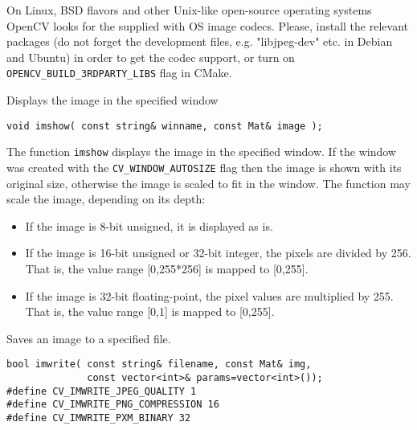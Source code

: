 On Linux, BSD flavors and other Unix-like open-source operating systems OpenCV looks for the supplied with OS image codecs. Please, install the relevant packages (do not forget the development files, e.g. "libjpeg-dev" etc. in Debian and Ubuntu) in order to get the codec support, or turn on \texttt{OPENCV\_BUILD\_3RDPARTY\_LIBS} flag in CMake. 

\label{imshow}
Displays the image in the specified window

\begin{lstlisting}
void imshow( const string& winname, const Mat& image );
\end{lstlisting}
\begin{description}
\end{description}

The function \texttt{imshow} displays the image in the specified window. If the window was created with the \texttt{CV\_WINDOW\_AUTOSIZE} flag then the image is shown with its original size, otherwise the image is scaled to fit in the window. The function may scale the image, depending on its depth:
\begin{itemize}
    \item If the image is 8-bit unsigned, it is displayed as is.
    \item If the image is 16-bit unsigned or 32-bit integer, the pixels are divided by 256. That is, the value range [0,255*256] is mapped to [0,255].
    \item If the image is 32-bit floating-point, the pixel values are multiplied by 255. That is, the value range [0,1] is mapped to [0,255].
\end{itemize}

\label{imwrite}
Saves an image to a specified file.

\begin{lstlisting}
bool imwrite( const string& filename, const Mat& img,
              const vector<int>& params=vector<int>());
#define CV_IMWRITE_JPEG_QUALITY 1
#define CV_IMWRITE_PNG_COMPRESSION 16
#define CV_IMWRITE_PXM_BINARY 32
\end{lstlisting}
\begin{description}
\end{description}

